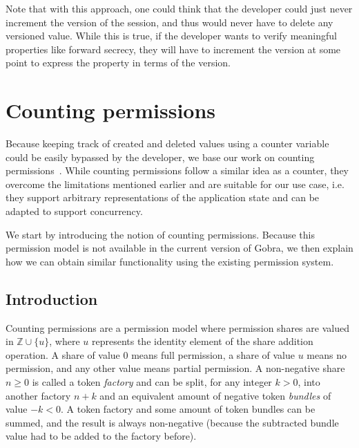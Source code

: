 Note that with this approach, one could think that the developer could just never increment the version of the session, and thus would never have to delete any versioned value. While this is true, if the developer wants to verify meaningful properties like forward secrecy, they will have to increment the version at some point to express the property in terms of the version.

\section{Counting permissions}
\label{sec:counting-permissions}

Because keeping track of created and deleted values using a counter variable could be easily bypassed by the developer, we base our work on counting permissions~\cite{roshardt2021extending}.
While counting permissions follow a similar idea as a counter, they overcome the limitations mentioned earlier and are suitable for our use case, i.e. they support arbitrary representations of the application state and can be adapted to support concurrency.

We start by introducing the notion of counting permissions.
Because this permission model is not available in the current version of Gobra, we then explain how we can obtain similar functionality using the existing permission system.

\subsection{Introduction}
\label{sec:counting-permissions-introduction}

Counting permissions are a permission model where permission shares are valued in $\mathbb{Z}\cup\{u\}$, where $u$ represents the identity element of the share addition operation. A share of value $0$ means full permission, a share of value $u$ means no permission, and any other value means partial permission. A non-negative share $n\geq0$ is called a token \emph{factory} and can be split, for any integer $k>0$, into another factory $n+k$ and an equivalent amount of negative token \emph{bundles} of value $-k<0$. A token factory and some amount of token bundles can be summed, and the result is always non-negative (because the subtracted bundle value had to be added to the factory before). 

